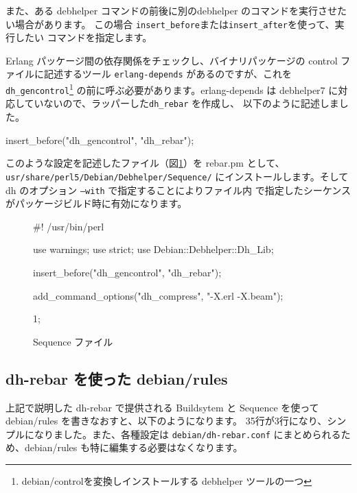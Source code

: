 \documentclass[mingoth,a4paper,twoside]{jsarticle}
\begin{document}
また、ある debhelper コマンドの前後に別のdebhelper のコマンドを実行させたい場合があります。
この場合 \texttt{insert\_before}または\texttt{insert\_after}を使って、実行したい
コマンドを指定します。

Erlang パッケージ間の依存関係をチェックし、バイナリパッケージの control ファイルに記述するツール \texttt{erlang-depends}
があるのですが、これを \texttt{dh\_gencontrol}\footnote{debian/controlを変換しインストールする debhelper ツールの一つ}
の前に呼ぶ必要があります。erlang-depends は debhelper7 に対応していないので、ラッパーした\texttt{dh\_rebar} を作成し、
以下のように記述しました。

\begin{commandline}
insert_before("dh_gencontrol", "dh_rebar");
\end{commandline}

このような設定を記述したファイル（図\ref{fig:debhelper-sequence}）を rebar.pm として、\texttt{usr/share/perl5/Debian/Debhelper/Sequence/}
にインストールします。そして dh のオプション \texttt{--with} で指定することによりファイル内
で指定したシーケンスがパッケージビルド時に有効になります。

\vspace{-1em}
\begin{figure}[h!]
  \centering
\begin{commandline}
#! /usr/bin/perl

use warnings;
use strict;
use Debian::Debhelper::Dh_Lib;

insert_before("dh_gencontrol", "dh_rebar");

add_command_options("dh_compress", "-X.erl -X.beam");

1;
\end{commandline}
\caption{Sequence ファイル}
\label{fig:debhelper-sequence}
\end{figure}
\vspace{-2.5em}

\subsection{dh-rebar を使った debian/rules}

上記で説明した dh-rebar で提供される Buildsytem と Sequence を使って
debian/rules を書きなおすと、以下のようになります。
35行が3行になり、シンプルになりました。また、各種設定は \texttt{debian/dh-rebar.conf}
にまとめられるため、debian/rules も特に編集する必要はなくなります。

\end{document}
